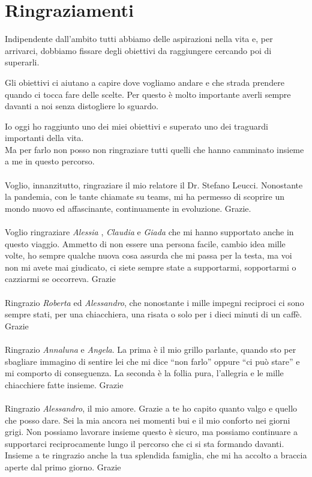 \chapter*{Ringraziamenti}

Indipendente dall'ambito tutti abbiamo delle aspirazioni nella vita e, per arrivarci, dobbiamo fissare degli obiettivi da raggiungere cercando poi di superarli.

Gli obiettivi ci aiutano a capire dove vogliamo andare e che strada prendere quando ci tocca fare delle scelte. Per questo \`e molto importante averli sempre davanti a noi senza distogliere lo sguardo.

Io oggi ho raggiunto uno dei miei obiettivi e superato uno dei traguardi importanti della vita.\\
Ma per farlo non posso non ringraziare tutti quelli che hanno camminato insieme a me in questo percorso.
\\
\\
Voglio, innanzitutto, ringraziare il mio relatore il Dr. Stefano Leucci. 
Nonostante la pandemia, con le tante chiamate su teams, mi ha permesso di scoprire un mondo nuovo ed affascinante, continuamente in evoluzione. Grazie.
\\
\\
Voglio ringraziare \textit{Alessia} , \textit{Claudia} e \textit{Giada} che mi hanno supportato anche in questo viaggio. 
Ammetto di non essere una persona facile, cambio idea mille volte, ho sempre qualche nuova cosa assurda che mi passa per la testa, ma voi non mi avete mai giudicato, ci siete sempre state a supportarmi, sopportarmi o cazziarmi se occorreva. Grazie
\\
\\
Ringrazio \textit{Roberta} ed \textit{Alessandro}, che nonostante i mille impegni reciproci ci sono sempre stati, per una chiacchiera, una risata o solo per i dieci minuti di un caff\`e. Grazie
\\
\\
Ringrazio \textit{Annaluna} e \textit{Angela}. La prima \`e il mio grillo parlante, quando sto per sbagliare immagino di sentire lei che mi dice ``non farlo'' oppure ``ci pu\`o stare'' e mi comporto di conseguenza. La seconda \`e la follia pura, l'allegria e le mille chiacchiere fatte insieme. Grazie
\\
\\
Ringrazio \textit{ Alessandro}, il mio amore. Grazie a te ho capito quanto valgo e quello che posso dare.
Sei la mia ancora nei momenti bui e il mio conforto nei giorni grigi. Non possiamo lavorare insieme questo \`e sicuro, ma possiamo continuare a supportarci reciprocamente lungo il percorso che ci si sta formando davanti. Insieme a te ringrazio anche la tua splendida famiglia, che mi ha accolto a braccia aperte dal primo giorno. Grazie
